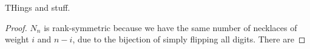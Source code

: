 \documentclass[11pt]{scrartcl}
\begin{document}
\begin{problem}
    THings and stuff.
\end{problem}
\begin{proof}
    $N_n$ is rank-symmetric because we have the same number of necklaces of weight $i$ and $n-i$, due to the bijection of simply flipping all digits. There are 
\end{proof}
\end{document}
